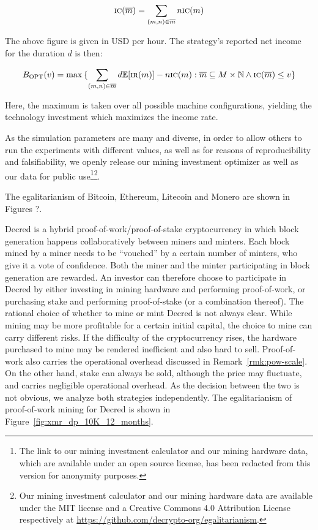 \[
  \textsc{ic}(\overline{m}) = \sum_{(m, n) \in \overline{m}}{n\textsc{ic}(m)}
\]

The above figure is given in USD per hour. The strategy's reported net income
for the duration $d$ is then:

\[
  B_\textsc{OPT}(v)
  =
  \max{
    \{
      \sum_{(m, n) \in \overline{m}}
      {d\mathbb{E}[\textsc{ir}(m)] - n\textsc{ic}(m)}:
      \overline{m} \subseteq M \times \mathbb{N}
      \land
      \textsc{ic}(\overline{m}) \leq v
    \}
  }
\]

Here, the maximum is taken over all possible machine configurations, yielding
the technology investment which maximizes the income rate.

As the simulation parameters are many and diverse, in order to allow others to
run the experiments with different values, as well as for reasons of
reproducibility and falsifiability, we openly release our mining investment
optimizer as well as our data for public use\ifanonymous\footnote{
  The link to our mining investment calculator and our mining hardware data,
  which are available under an open source license, has been redacted from this
  version for anonymity purposes.
}\else\footnote{
  Our mining investment calculator and our mining hardware data are available
  under the MIT license and a Creative Commons 4.0 Attribution License
  respectively at \url{https://github.com/decrypto-org/egalitarianism}.
}\fi.

The egalitarianism of Bitcoin, Ethereum, Litecoin and Monero are shown in
Figures ?.

Decred is a hybrid proof-of-work/proof-of-stake cryptocurrency in which block
generation happens collaboratively between miners and minters. Each block mined
by a miner needs to be ``vouched'' by a certain number of minters, who give it a
vote of confidence. Both the miner and the minter participating in block
generation are rewarded. An investor can therefore choose to participate in
Decred by either investing in mining hardware and performing proof-of-work, or
purchasing stake and performing proof-of-stake (or a combination thereof). The
rational choice of whether to mine or mint Decred is not always clear. While
mining may be more profitable for a certain initial capital, the choice to mine
can carry different risks. If the difficulty of the cryptocurrency rises, the
hardware purchased to mine may be rendered inefficient and also hard to sell.
Proof-of-work also carries the operational overhead discussed in
Remark~\ref{rmk:pow-scale}. On the other hand, stake can always be sold,
although the price may fluctuate, and carries negligible operational overhead.
As the decision between the two is not obvious, we analyze both strategies
independently. The egalitarianism of proof-of-work mining for Decred is shown in
Figure~\ref{fig:xmr_dp_10K_12_months}.

